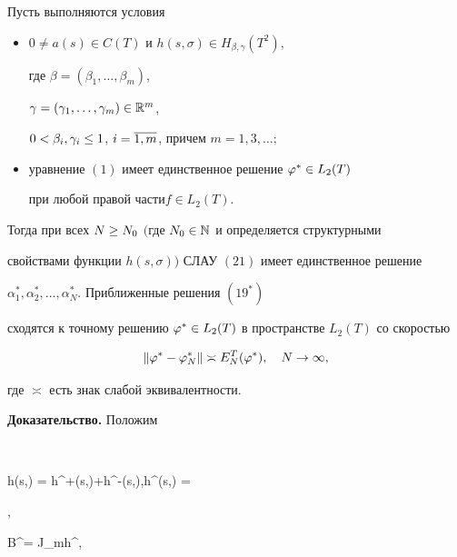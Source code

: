 \begin{thm}


Пусть выполняются условия


\begin{itemize}


\item[а)] $0\ne a(s)\in C(T)$ и $h(s,\sigma)\in H_{\beta,\gamma}(T^2)$,


где $\beta = (\beta_1,\dotsc, \beta_m)$, 


$\gamma=(\gamma_1,\dotsc,\gamma_m)\in \Bbb {R}^m$,\linebreak


$0<\beta_i,\gamma_i\le 1$, $i=\overline{1,m}$, причем $m=1,3,\dotsc;$


\item[б)] уравнение $(1)$ имеет единственное решение $\varphi^*\in L_2(T)$ 


при любой правой части\linebreak $f\in L_2(T)$.


\end{itemize}





Тогда при всех $N\ge N_0$ $($где $N_0\in \Bbb {N}$ и определяется структурными 


свойствами функции $h(s,\sigma))$ СЛАУ $(21)$ имеет единственное решение 


$\alpha_1^*,\alpha_2^*,\dotsc,\alpha_N^*$. Приближенные решения $(19^*)$


сходятся к точному решению $\varphi^*\in L_2(T)$ в пространстве $L_2(T)$ со скоростью


\begin{equation}


\|\vp^* - \vp_N^*\|\asymp E_N^T(\vp^*),\quad N\to \infty,


\end{equation}


где $\asymp$ есть знак слабой эквивалентности.


\end{thm}








{\bf Доказательство.} Положим


$$


h(s,\sigma) = h^+(s,\sigma)+h^-(s,\sigma),\quad h^{\pm}(s,\sigma) =


,\quad


B^{\pm}\vp = J_mh^{\pm}\vp,


